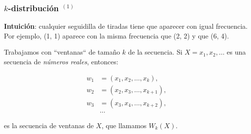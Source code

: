 \documentclass[t, 10pt, mathserif]{beamer}
\begin{document}

\begin{frame}
  \frametitle{$k$-distribución {$^{(1)}$}}


  \textbf{Intuición}: cualquier seguidilla de tiradas tiene que aparecer con igual frecuencia. Por ejemplo, (1, 1) aparece con la misma frecuencia que (2, 2) y que (6, 4).
  \pause

  Trabajamos con ``ventanas`` de tamaño $k$ de la secuencia. Si $X = x_1, x_2, \dots$ es una secuencia de \textit{números reales}, entonces:
  \pause

  \vspace{-0.3cm}
  \begin{equation*}
    \begin{aligned}
        w_1 & = (x_1, x_2, \dots, x_k      ), \\
        w_2 & = (x_2, x_3, \dots, x_{k + 1}), \\
        w_3 & = (x_3, x_4, \dots, x_{k + 2}), \\
            & \dots
    \end{aligned}
  \end{equation*}

  es la secuencia de ventanas de $X$, que llamamos $W_k(X)$.
\end{frame}

\end{document}
